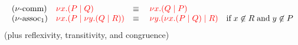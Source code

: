 \begin{definition}\label{def:cp-equiv}
  \[
    \begin{array}{llll}
      (\nu\text{-comm})
      & \textcolor{red}{\nu x.(P \mid Q)}
      & \equiv \;
      & \textcolor{red}{\nu x.(Q \mid P)}
      \\
      (\nu\text{-assoc}_{1})
      & \textcolor{red}{\nu x.(P \mid \nu y.(Q \mid R))}
      & \equiv \;
      & \textcolor{red}{\nu y.(\nu x.(P \mid Q) \mid R)}
        \quad \text{if} \; x \not\in R \; \text{and} \; y \not\in P
    \end{array}
  \]
  (plus reflexivity, transitivity, and congruence)
\end{definition}
